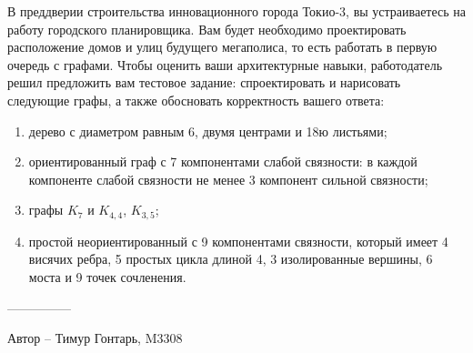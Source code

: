\question
В преддверии строительства инновационного города Токио-3, вы устраиваетесь на работу городского планировщика. Вам будет необходимо проектировать расположение домов и улиц будущего мегаполиса, то есть работать в первую очередь с графами. Чтобы оценить ваши архитектурные навыки, работодатель решил предложить вам тестовое задание: спроектировать и нарисовать следующие графы, а также обосновать корректность вашего ответа:

\begin{enumerate}
\item  дерево с диаметром равным 6, двумя центрами  и  18ю листьями;
\item  ориентированный граф с 7 компонентами слабой связности: в  каждой компоненте слабой связности не менее 3 компонент сильной связности;
\item  графы $K_7$ и $K_{4,4}$, $K_{3,5}$;
\item  простой неориентированный с 9 компонентами связности, который имеет 4 висячих ребра, 5 простых цикла длиной 4, 3 изолированные вершины, 6 моста и 9 точек сочленения.
\end{enumerate}

---------------

Автор -- Тимур Гонтарь, M3308
